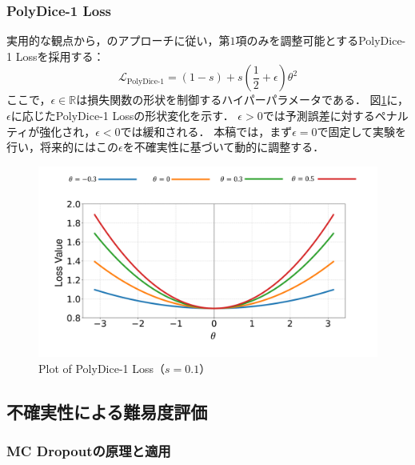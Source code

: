 \documentclass[10pt, a4paper, twocolumn]{jarticle}
\begin{document}

\subsubsection{PolyDice-1 Loss}
実用的な観点から，\cite{leng2022polyloss}のアプローチに従い，第$1$項のみを調整可能とするPolyDice-1 Lossを採用する：
\begin{equation}
  \mathcal{L}_{\text{PolyDice-1}} = (1 - s) + s \left(\frac{1}{2} + \epsilon\right) \theta^2
\end{equation}
ここで，$\epsilon \in \mathbb{R}$は損失関数の形状を制御するハイパーパラメータである．
図\ref{polydice}に，$\epsilon$に応じたPolyDice-1 Lossの形状変化を示す．
$\epsilon > 0$では予測誤差に対するペナルティが強化され，$\epsilon < 0$では緩和される．
本稿では，まず$\epsilon = 0$で固定して実験を行い，将来的にはこの$\epsilon$を不確実性に基づいて動的に調整する．

\begin{figure}
  \includegraphics[scale=0.25]{figure/loss.pdf}
  \caption{Plot of PolyDice-1 Loss（$s = 0.1$）}
  \label{polydice}
\end{figure}

\subsection{不確実性による難易度評価}

\subsubsection{MC Dropoutの原理と適用}
\end{document}

